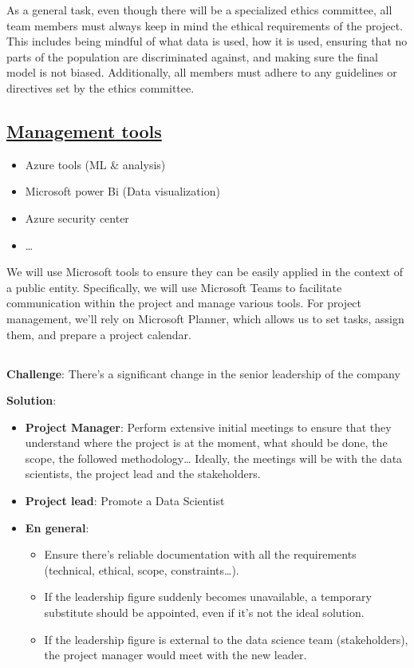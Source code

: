 As a general task, even though there will be a specialized ethics committee,
all team members must always keep in mind the ethical requirements of the project.
This includes being mindful of what data is used, how it is used,
ensuring that no parts of the population are discriminated against, and making sure the final model is not biased.
Additionally, all members must adhere to any guidelines or directives set by the ethics committee.

\subsection{\href{https://www.microsoft.com/es-es/microsoft-365/planner/microsoft-planner}{Management tools}}\label{subsec:management-tools}
\begin{itemize}
    \item Azure tools (ML \& analysis)
    \item Microsoft power Bi (Data visualization)
    \item Azure security center
    \item \dots
\end{itemize}
We will use Microsoft tools to ensure they can be easily applied in the context of a public entity.
Specifically, we will use Microsoft Teams to facilitate communication within the project and manage various tools.
For project management, we’ll rely on Microsoft Planner, which allows us to set tasks, assign them, and prepare a project calendar.
\subsection*{}
\begin{warning}
    \textbf{Challenge}: There’s a significant change in the senior leadership of the company

    \textbf{Solution}:

    \begin{itemize}
        \item \textbf{Project Manager}: Perform extensive initial meetings to ensure that they understand where the project is at the moment, what should be done, the scope, the followed methodology… Ideally, the meetings will be with the data scientists, the project lead and the stakeholders.
        \item \textbf{Project lead}: Promote a Data Scientist
        \item \textbf{En general}:
        \begin{itemize}
            \item Ensure there's reliable documentation with all the requirements (technical, ethical, scope, constraints…).
            \item If the leadership figure suddenly becomes unavailable, a temporary substitute should be appointed, even if it’s not the ideal solution.
            \item If the leadership figure is external to the data science team (stakeholders), the project manager would meet with the new leader.
        \end{itemize}
    \end{itemize}
\end{warning}